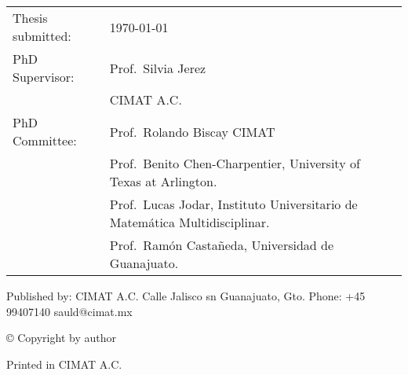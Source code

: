 \thispagestyle{empty}
\noindent
\begin{tabularx}{\textwidth}{@{}lX}
    Thesis submitted:	& \today\\
    PhD Supervisor:		& Prof.\ Silvia Jerez\\
					    & CIMAT A.C.\\
    PhD Committee:		& Prof.\ Rolando Biscay CIMAT\\
					    & Prof.\ Benito Chen-Charpentier, 
						University of Texas at Arlington.\\
						& Prof.\ Lucas Jodar,
						Instituto Universitario de Matemática Multidisciplinar. \\
						& Prof.\ Ram\'on Casta\~{n}eda, Universidad de Guanajuato.\\
						
\end{tabularx}
\strut\vfill
\noindent
	\noindent Published by:\newline
	CIMAT A.C. \newline
	Calle Jalisco sn\newline
	Guanajuato, Gto.\newline
	Phone: +45 99407140\newline
	sauld@cimat.mx\newline
	\strut\vfill
	\noindent \copyright{} Copyright by author\newline
	\strut\vfill
	\noindent Printed in CIMAT A.C. 
	\strut\vfill\vfill\vfill
	\clearpage

